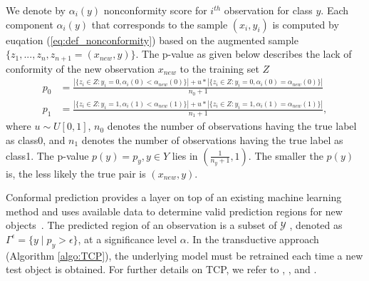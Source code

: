 \documentclass[main]{subfiles}
\begin{document}
We denote by $\alpha_i(y)$ nonconformity score for $i^{th}$ observation for class $y$. Each component  $\alpha_i(y)$ that corresponds to the sample $(x_i,y_i)$ is computed by
euqation (\ref{eq:def_nonconformity}) based on the augmented sample  $\{ z_1 , ..., z_n, z_{n+1}=(x_{new},y) \}$. The p-value as given below describes the lack of conformity of the  new observation $x_{new}$ to the training set $Z$
 \begin{align*}
 p_0 &= \frac{| \{ z_i \in Z : y_i=0, \alpha_i(0) < \alpha_{new}(0) \} | + u* | \{ z_i \in Z : y_i=0, \alpha_i(0) = \alpha_{new}(0)\} |}{n_0+1} \\
 p_1 &= \frac{| \{ z_i \in Z :  y_i=1, \alpha_i(1) < \alpha_{new}(1) \}  |+u*|  \{ z_i \in Z :  y_i=1, \alpha_i(1) =\alpha_{new}(1) \} |}{n_1+1} ,
 \end{align*}
 where $u \sim U[0,1]$, $n_0$ denotes the number of observations having the true label as class0, and $n_1$ denotes the number of observations having the true label as class1.
The p-value $p(y)=p_y, y \in Y$ lies in $ \left( \frac{1}{n_y+1},1 \right)$. The smaller the $p(y)$
 is, the less likely the true pair is $(x_{new},y)$.

 
Conformal prediction provides a layer on top of an existing machine learning method and uses available data to determine valid prediction regions for new objects~\citep{vovk2005algorithmic}. 
The predicted region of an observation is a subset of $\mathcal{Y}$ , denoted as $\Gamma^{\epsilon} = \{ y \mid p_y > \epsilon \}$, at a significance level $\alpha$. In the transductive approach (Algorithm \ref{algo:TCP}), the underlying model must be retrained each time a new test object is obtained. For further details on TCP, we refer to \cite{vapnik1998statistical}, \cite{shafer2008tutorial}, \cite{vovk2005algorithmic} and \cite{balasubramanian2014conformal}. 
\end{document}
